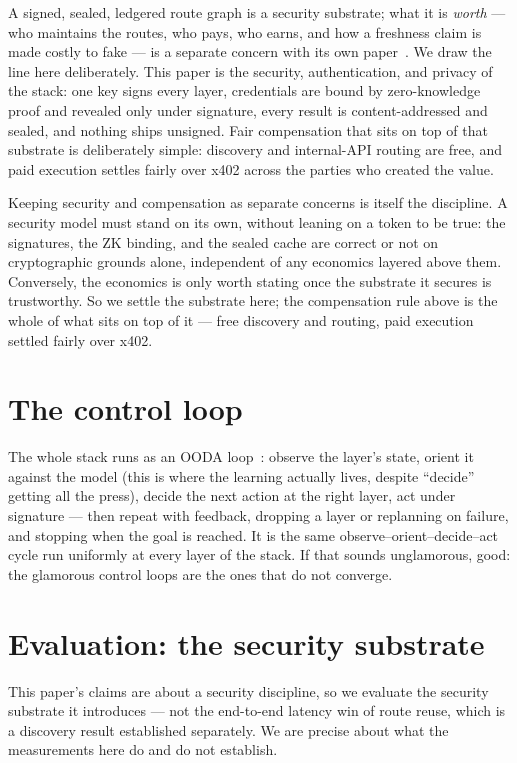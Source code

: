 \documentclass[11pt]{article}
\begin{document}
A signed, sealed, ledgered route graph is a security substrate; what it is
\emph{worth} --- who maintains the routes, who pays, who earns, and how a freshness
claim is made costly to fake --- is a separate concern with its own
paper~\cite{maintenance}. We draw the line here deliberately. This paper is the security, authentication, and privacy
of the stack: one key signs every layer, credentials are bound by zero-knowledge
proof and revealed only under signature, every result is content-addressed and
sealed, and nothing ships unsigned. Fair compensation that sits on top of that
substrate is deliberately simple: discovery and internal-API routing are free, and
paid execution settles fairly over x402 across the parties who created the value.

Keeping security and compensation as separate concerns is itself the discipline. A security
model must stand on its own, without leaning on a token to be true: the signatures,
the ZK binding, and the sealed cache are correct or not on cryptographic grounds
alone, independent of any economics layered above them. Conversely, the economics
is only worth stating once the substrate it secures is trustworthy. So we settle
the substrate here; the compensation rule above is the whole of what sits on top of
it --- free discovery and routing, paid execution settled fairly over x402.
\section{The control loop}

The whole stack runs as an OODA loop~\cite{ooda}: observe the layer's state, orient
it against the model (this is where the learning actually lives, despite ``decide''
getting all the press), decide the next action at the right layer, act under
signature --- then repeat with feedback, dropping a layer or replanning on failure,
and stopping when the goal is reached. It is the same observe--orient--decide--act
cycle run uniformly at every layer of the stack. If that sounds unglamorous, good:
the glamorous control loops are the ones that do not converge.



\section{Evaluation: the security substrate}

This paper's claims are about a security discipline, so we evaluate the security
substrate it introduces --- not the end-to-end latency win of route reuse, which is
a discovery result established separately. We
are precise about what the measurements here do and do not establish.
\end{document}
